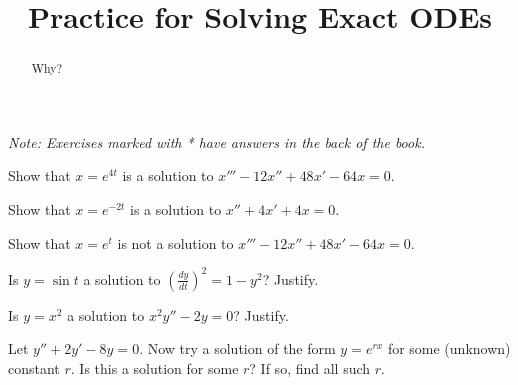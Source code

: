 \documentclass{ximera}
\title{Practice for Solving Exact ODEs}
\begin{document}
\begin{abstract}
    Why?
\end{abstract}
\maketitle

\noindent
\emph{Note: Exercises marked with * have answers in the back of the book.}


\begin{exercise}
    Show that $x = e^{4t}$ is a solution to $x'''-12 x'' + 48 x' - 64 x = 0$.
\end{exercise}

\begin{exercise}%
    Show that $x = e^{-2t}$ is a solution to $x'' + 4x' + 4x = 0$.
\end{exercise}

\begin{exercise}
    Show that $x = e^{t}$ is not a solution to $x'''-12 x'' + 48 x' - 64 x = 0$.
\end{exercise}

\begin{exercise}
    Is $y = \sin t$ a solution to ${\left( \frac{dy}{dt} \right)}^2 = 1 - y^2$? Justify.
\end{exercise}

\begin{exercise}%
    Is $y = x^2$ a solution to $x^2y'' - 2y = 0$?  Justify.
\end{exercise}

\begin{exercise}
    Let $y'' + 2y' - 8y = 0$.  Now try a solution of the form $y = e^{rx}$ for some (unknown) constant $r$.  Is this a solution for some $r$?  If so, find all such $r$.
\end{exercise}
\end{document}
